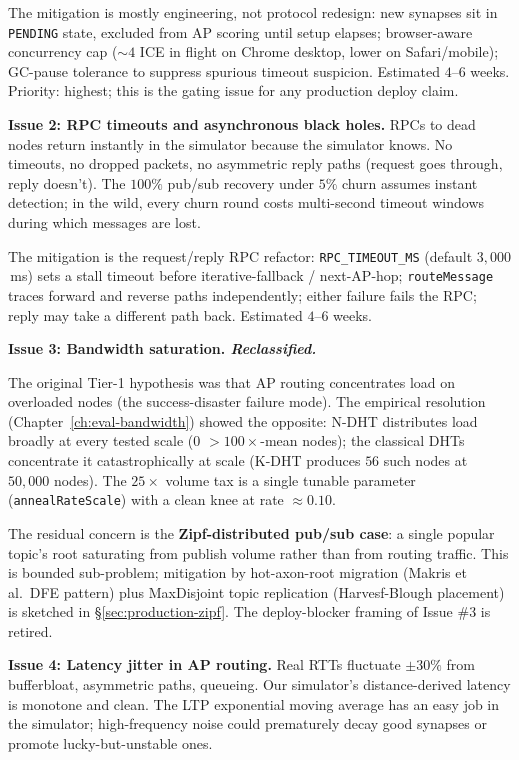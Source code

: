 \documentclass[twoside,nobib]{tufte-book}
\newcommand{\NDHT}{N-DHT\xspace}
\newcommand{\KDHT}{K-DHT\xspace}
\begin{document}
The mitigation is mostly engineering, not protocol redesign:
new synapses sit in \texttt{PENDING} state, excluded from AP
scoring until setup elapses; browser-aware concurrency cap
($\sim 4$ ICE in flight on Chrome desktop, lower on
Safari/mobile); GC-pause tolerance to suppress spurious
timeout suspicion. Estimated $4$--$6$ weeks. Priority: highest;
this is the gating issue for any production deploy claim.

\textbf{Issue 2: RPC timeouts and asynchronous black holes.}
RPCs to dead nodes return instantly in the simulator because
the simulator knows. No timeouts, no dropped packets, no
asymmetric reply paths (request goes through, reply doesn't).
The $100\%$ pub/sub recovery under $5\%$ churn assumes instant
detection; in the wild, every churn round costs multi-second
timeout windows during which messages are lost.

The mitigation is the request/reply RPC refactor:
\texttt{RPC\_TIMEOUT\_MS} (default $3{,}000$\,ms) sets a stall
timeout before iterative-fallback / next-AP-hop;
\texttt{routeMessage} traces forward and reverse paths
independently; either failure fails the RPC; reply may take a
different path back. Estimated $4$--$6$ weeks.

\textbf{Issue 3: Bandwidth saturation. \emph{Reclassified.}}

The original Tier-1 hypothesis was that AP routing concentrates
load on overloaded nodes (the success-disaster failure mode).
The empirical resolution
(Chapter~\ref{ch:eval-bandwidth}) showed the opposite: \NDHT
distributes load broadly at every tested scale ($0$
$>100\times$-mean nodes); the classical DHTs concentrate it
catastrophically at scale (\KDHT produces $56$ such nodes at
$50{,}000$ nodes). The $25\times$ volume tax is a single
tunable parameter (\texttt{annealRateScale}) with a clean
knee at rate $\approx 0.10$.

The residual concern is the \textbf{Zipf-distributed pub/sub
case}: a single popular topic's root saturating from publish
volume rather than from routing traffic. This is bounded
sub-problem; mitigation by hot-axon-root migration
(Makris et al.\ DFE pattern) plus MaxDisjoint topic
replication (Harvesf-Blough placement) is sketched in
\S\ref{sec:production-zipf}. The deploy-blocker framing of
Issue \#3 is retired.

\textbf{Issue 4: Latency jitter in AP routing.} Real RTTs
fluctuate $\pm 30\%$ from bufferbloat, asymmetric paths,
queueing. Our simulator's distance-derived latency is monotone
and clean. The LTP exponential moving average has an easy job
in the simulator; high-frequency noise could prematurely decay
good synapses or promote lucky-but-unstable ones.
\end{document}
